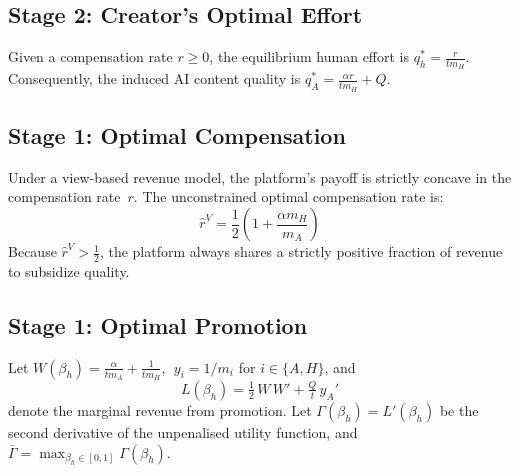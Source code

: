 \documentclass[mnsc,nonblindrev]{informs3_NoOR}
\begin{document}
\subsection{Stage 2: Creator's Optimal Effort}

\begin{proposition}\label{prop:effort}
Given a compensation rate $r \geq 0$, the equilibrium human effort is $q_h^* = \frac{r}{t m_H}$. Consequently, the induced AI content quality is $q_A^* = \frac{\alpha r}{t m_H} + Q$.
\end{proposition}

\subsection{Stage 1: Optimal Compensation}

\begin{proposition}\label{prop:rstar-view}
Under a view-based revenue model, the platform's payoff is strictly concave in the compensation rate~$r$. The unconstrained optimal compensation rate is:
\begin{equation}\label{eq:rhat-view}
\hat{r}^V = \frac{1}{2}\left(1 + \frac{\alpha m_H}{m_A}\right)
\end{equation}
Because $\hat{r}^V > \frac{1}{2}$, the platform always shares a strictly positive fraction of revenue to subsidize quality. 
\end{proposition}

\subsection{Stage 1: Optimal Promotion}


Let $W(\beta_h) = \frac{\alpha}{tm_A} + \frac{1}{tm_H} $, $\;y_i = 1/m_i$ for $i \in \{A,H\}$, and
\[
L(\beta_h) = \tfrac{1}{2}\,W\,W' + \tfrac{Q}{t}\,y_A' 
\]
denote the marginal revenue from promotion. Let $\Gamma(\beta_h) = L'(\beta_h)$ be the second derivative of the unpenalised utility function, and $\bar\Gamma = \max_{\beta_h \in [0,1]} \Gamma(\beta_h)$.
 
\end{document}
